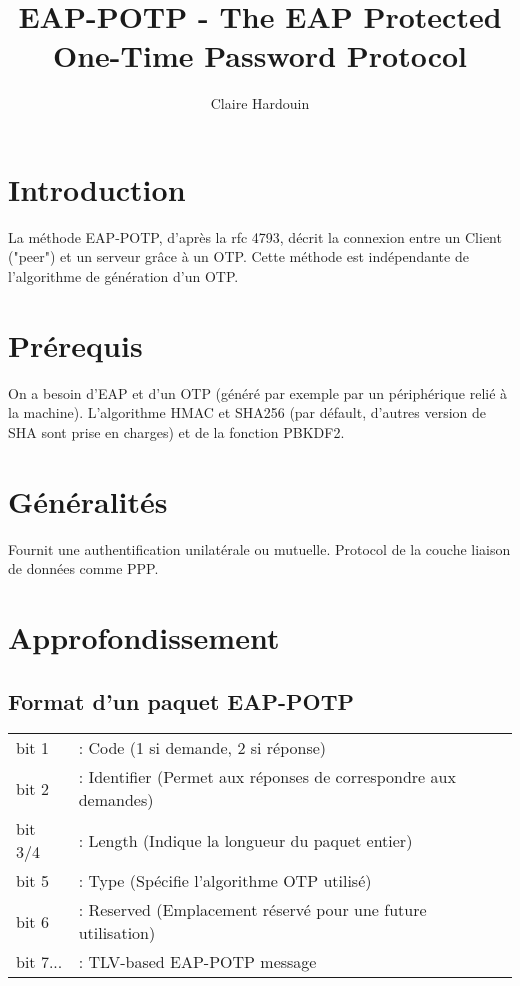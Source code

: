 \documentclass{article}
\title{EAP-POTP - The EAP Protected One-Time Password Protocol}
\author{Claire Hardouin}
\begin{document}
\maketitle

\newpage
\tableofcontents
\newpage

\section{Introduction}
La méthode EAP-POTP, d'après la rfc 4793, décrit la connexion entre un Client ("peer") et un serveur grâce à un OTP.
Cette méthode est indépendante de l'algorithme de génération d'un OTP.

\section{Prérequis}
On a besoin d'EAP et d'un OTP (généré par exemple par un périphérique relié à la machine).
L'algorithme HMAC et SHA256 (par défault, d'autres version de SHA sont prise en charges) et de la fonction PBKDF2.

\section{Généralités}
Fournit une authentification unilatérale ou mutuelle.
Protocol de la couche liaison de données comme PPP.

\section{Approfondissement}

\subsection{Format d'un paquet EAP-POTP}

\begin{tabular}{  l  l  }
	bit 1 &: Code (1 si demande, 2 si réponse)\\
	bit 2 &: Identifier (Permet aux réponses de correspondre aux demandes)\\
	bit 3/4 &: Length (Indique la longueur du paquet entier)\\
	bit 5 &: Type (Spécifie l'algorithme OTP utilisé)\\
	bit 6 &: Reserved (Emplacement réservé pour une future utilisation)\\
	bit 7... &: TLV-based EAP-POTP message \\
\end{tabular}
\end{document}
